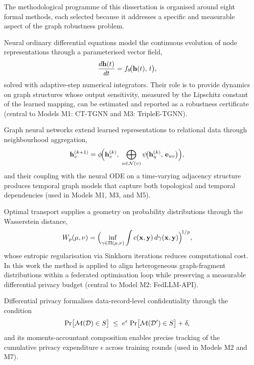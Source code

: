 The methodological programme of this dissertation is organised around eight formal methods, each selected because it addresses a specific and measurable aspect of the graph robustness problem.

Neural ordinary differential equations model the continuous evolution of node representations through a parameterised vector field,\begin{equation}
\frac{d\mathbf{h}(t)}{dt} = f_\theta\!\bigl(\mathbf{h}(t),\, t\bigr),
\label{eq:node}
\end{equation}solved with adaptive-step numerical integrators. Their role is to provide dynamics on graph structures whose output sensitivity, measured by the Lipschitz constant of the learned mapping, can be estimated and reported as a robustness certificate (central to Models M1: CT-TGNN and M3: TripleE-TGNN).

Graph neural networks extend learned representations to relational data through neighbourhood aggregation,\begin{equation}
\mathbf{h}_v^{(k+1)}
= \phi\!\Bigl(\mathbf{h}_v^{(k)},\;
  \bigoplus_{u\in\mathcal{N}(v)}
    \psi\!\bigl(\mathbf{h}_u^{(k)},\, \mathbf{e}_{uv}\bigr)\Bigr),
\label{eq:gnn_mp}
\end{equation}and their coupling with the neural ODE on a time-varying adjacency structure produces temporal graph models that capture both topological and temporal dependencies (used in Models M1, M3, and M5).

Optimal transport supplies a geometry on probability distributions through the Wasserstein distance,\begin{equation}
W_p(\mu,\nu)
= \Bigl(\inf_{\gamma\in\Pi(\mu,\nu)}
    \int c(\mathbf{x},\mathbf{y})\,d\gamma(\mathbf{x},\mathbf{y})
  \Bigr)^{\!1/p},
\label{eq:wasserstein}
\end{equation}whose entropic regularisation via Sinkhorn iterations reduces computational cost. In this work the method is applied to align heterogeneous graph-fragment distributions within a federated optimisation loop while preserving a measurable differential privacy budget (central to Model M2: FedLLM-API).

Differential privacy formalises data-record-level confidentiality through the condition\begin{equation}
\mathrm{Pr}\bigl[\mathcal{M}(\mathcal{D})\in S\bigr]
\;\le\;
e^{\epsilon}\;\mathrm{Pr}\bigl[\mathcal{M}(\mathcal{D}')\in S\bigr] + \delta,
\label{eq:dp}
\end{equation}
and its moments-accountant composition enables precise tracking of the cumulative privacy expenditure $\epsilon$ across training rounds (used in Models M2 and M7).

